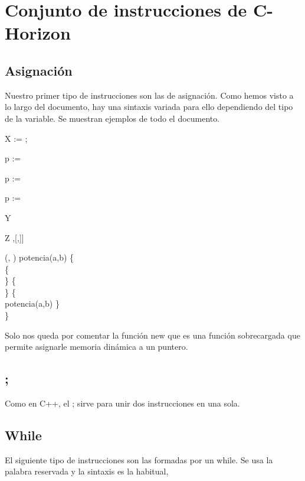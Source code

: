 \chapter{Conjunto de instrucciones de C-Horizon}
\label{cap:instrucciones}



\section{Asignación}
Nuestro primer tipo de instrucciones son las de asignación. Como hemos visto a lo largo del documento, hay una sintaxis variada para ello dependiendo del tipo de la variable. Se muestran ejemplos de todo el documento.

\begin{algorithm}

	\Integer{} X  := ;
	
	\Integer{\operator{*}} p  := \;
	
	p :=  \;
	
	\operator{*}p := 
	
	\Boolean{[\const{3}]} Y  \;
	
	\Integer{[\const{2}][\const{2}]} Z \Assign 
	[[\const{0},\const{1}],[,]] \;
	
	\Integer{}(\Integer{}, \Integer{}) potencia(a,b) \{ \\
	\quad {} \{\\
	\quad \quad {} \;
	\quad \}  \{\\
	\quad \quad {} \;
	\quad \} \Elsee \{\\
	\quad \quad {} potencia(a,b\operator{-})\;
	\quad \} \\
	\}\;
	
	
\end{algorithm}

Solo nos queda por comentar la función new que es una función sobrecargada que permite asignarle memoria dinámica a un puntero.
\section{;}
Como en C++, el ; sirve para unir dos instrucciones en una sola.

\section{While}
El siguiente tipo de instrucciones son las formadas por un while. Se usa la palabra reservada  y la sintaxis es la habitual,


